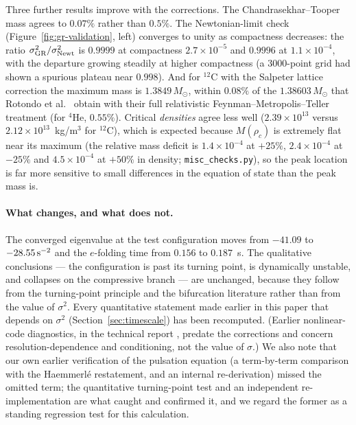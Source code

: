 \documentclass[11pt]{article}
\begin{document}
Three further results improve with the corrections. The Chandrasekhar--Tooper mass agrees to $0.07\%$ rather than $0.5\%$. The Newtonian-limit check (Figure~\ref{fig:gr-validation}, left) converges to unity as compactness decreases: the ratio $\sigma^2_{\rm GR}/\sigma^2_{\rm Newt}$ is $0.9999$ at compactness $2.7\times10^{-5}$ and $0.9996$ at $1.1\times10^{-4}$, with the departure growing steadily at higher compactness (a $3000$-point grid had shown a spurious plateau near $0.998$). And for $^{12}$C with the Salpeter lattice correction the maximum mass is $1.3849\,M_\odot$, within $0.08\%$ of the $1.38603\,M_\odot$ that Rotondo et al.\ \citep{RotondoRRX2011} obtain with their full relativistic Feynman--Metropolis--Teller treatment (for $^{4}$He, $0.55\%$). Critical \emph{densities} agree less well ($2.39\times10^{13}$ versus $2.12\times10^{13}$~kg/m$^3$ for $^{12}$C), which is expected because $M(\rho_c)$ is extremely flat near its maximum (the relative mass deficit is $1.4\times10^{-4}$ at $+25\%$, $2.4\times10^{-4}$ at $-25\%$ and $4.5\times10^{-4}$ at $+50\%$ in density; \texttt{misc\_checks.py}), so the peak location is far more sensitive to small differences in the equation of state than the peak mass is.

\paragraph{What changes, and what does not.} The converged eigenvalue at the test configuration moves from $-41.09$ to $-28.55\,{\rm s}^{-2}$ and the $e$-folding time from $0.156$ to $0.187$~s. The qualitative conclusions --- the configuration is past its turning point, is dynamically unstable, and collapses on the compressive branch --- are unchanged, because they follow from the turning-point principle and the bifurcation literature rather than from the value of $\sigma^2$. Every quantitative statement made earlier in this paper that depends on $\sigma^2$ (Section~\ref{sec:timescale}) has been recomputed. (Earlier nonlinear-code diagnostics, in the technical report \citep{OwnbyPhase2}, predate the corrections and concern resolution-dependence and conditioning, not the value of $\sigma$.) We also note that our own earlier verification of the pulsation equation (a term-by-term comparison with the Haemmerl\'e restatement, and an internal re-derivation) missed the omitted term; the quantitative turning-point test and an independent re-implementation are what caught and confirmed it, and we regard the former as a standing regression test for this calculation.
\end{document}
